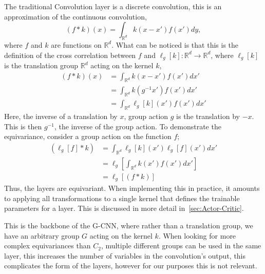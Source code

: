 The traditional Convolution layer is a discrete convolution, this is an approximation of the continuous convolution,
\begin{equation}
	(f*k)(x) = \int_{\mathbb{R}^d} k(x-x')f(x')dy,
\end{equation}
where $f$ and $k$ are functions on $\mathbb{R}^d$. What can be noticed is that this is the definition of the cross correlation between $f$ and $\ell_g[k]:  \mathbb{R}^d  \rightarrow \mathbb{R}^d$, where $\ell_g[k]$
is the translation group $\mathbb{R}^d$ acting on the kernel $k$,
\begin{align}
	(f*k)(x) & = \int_{\mathbb{R}^d} k(x-x')f(x')dx'       \\
	         & = \int_{\mathbb{R}^d} k(g^{-1}x')f(x')dx'   \\
	         & = \int_{\mathbb{R}^d} \ell_g[k](x')f(x')dx'
\end{align}
Here, the inverse of a translation by $x$, group action $g$ is the translation by $-x$. This is then $g^{-1}$, the inverse of the group action. To demonstrate the equivariance, consider a group action on the function $f$;
\begin{align}
	(\ell_g[f]* k) & = \int_{\mathbb{R}^d} \ell_g[k](x')\ell_g[f](x')dx' \\
	               & = \ell_g[\int_{\mathbb{R}^d} k(x')f(x')dx']         \\
	               & = \ell_g[(f * k)]
\end{align}
Thus, the layers are equivariant. When implementing this in practice, it amounts to applying all transformations to a single kernel that defines the trainable parameters for a layer. This is discussed in more detail in~\ref{sec:Actor-Critic}.

This is the backbone of the G-CNN\cite{cohen2016group}, where rather than a translation group, we have an arbitrary group $G$ acting on the kernel $k$. When looking for more complex equivariances than $C_2$, multiple different groups can be used in the same layer, this increases the number of variables in the convolution's output, this complicates the form of the layers, however for our purposes this is not relevant.



